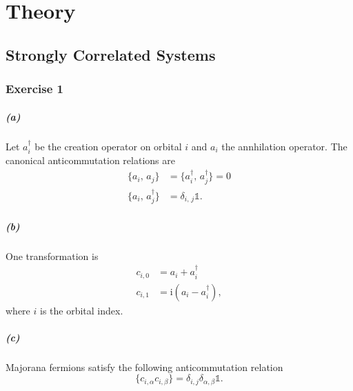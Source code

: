 \chapter{Theory}

\section{Strongly Correlated Systems}
\subsection{Exercise 1}
\paragraph*{(a)} Let $a_i^\dagger$ be the creation operator on orbital $i$ and $a_i$ the annhilation operator. The canonical anticommutation relations are
\begin{align}
    \{a_i,\, a_j\} &= \{a_i^\dagger,\, a_j^\dagger\} = 0 \\
    \{a_i,\, a_j^\dagger\} &= \delta_{i,\, j} \mathds{1}.
\end{align}

\paragraph*{(b)} One transformation is
\begin{align}
    c_{i,0} &= a_i + a_i^\dagger \\
    c_{i,1} &= \mathrm{i}(a_i - a_i^\dagger),
\end{align}
where $i$ is the orbital index.

\paragraph*{(c)} Majorana fermions satisfy the following anticommutation relation
\begin{equation}
    \{c_{i,\alpha}c_{i,\beta}\} = \delta_{i,j}\delta_{\alpha,\beta} \mathds{1}.
\end{equation}
